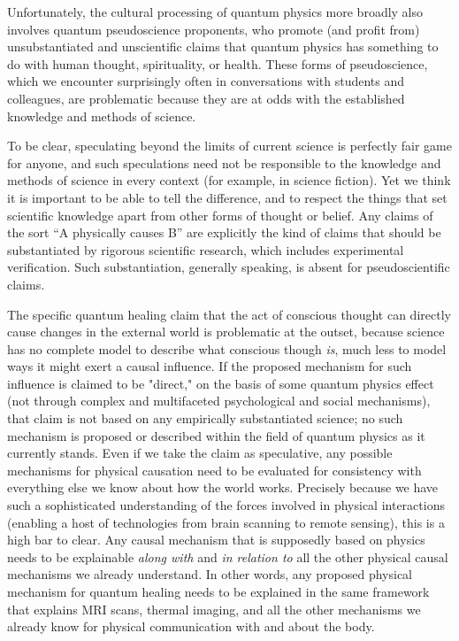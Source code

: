 \documentclass[onecolumn,preprintnumbers,amsmath,amssymbn,reprint,nofootinbib,superscriptaddress]{revtex4}    %
\begin{document}
Unfortunately, the cultural processing of quantum physics more broadly also involves quantum pseudoscience proponents, who promote (and profit from) unsubstantiated and unscientific claims that quantum physics has something to do with human thought, spirituality, or health\cite{Pessoa}.  These forms of pseudoscience, which we encounter surprisingly often in conversations with students and colleagues, are problematic because they are at odds with the established knowledge and methods of science. 

To be clear, speculating beyond the limits of current science is perfectly fair game for anyone, and such speculations need not be responsible to the knowledge and methods of science in every context (for example, in science fiction).  Yet we think it is important to be able to tell the difference, and to respect the things that set scientific knowledge apart from other forms of thought or belief. Any claims of the sort ``A physically causes B'' are explicitly the kind of claims that should be substantiated by rigorous scientific research, which includes experimental verification.  
Such substantiation, generally speaking, is absent for pseudoscientific claims.  

The specific quantum healing claim that the act of conscious thought can directly cause changes in the external world is problematic at the outset, because science has no complete model to describe what conscious though {\em is}, much less to model ways it might exert a causal influence. If the proposed mechanism for such influence is claimed to be "direct," on the basis of some quantum physics effect (not through complex and multifaceted psychological and social mechanisms), that claim is not based on any empirically substantiated science; no such mechanism is proposed or described within the field of quantum physics as it currently stands.  Even if we take the claim as speculative, any possible mechanisms for physical causation need to be evaluated for consistency with everything else we know about how the world works. Precisely because we have such a sophisticated understanding of the forces involved in physical interactions (enabling a host of technologies from brain scanning to remote sensing), this is a high bar to clear. Any causal mechanism that is supposedly based on physics needs to be explainable {\em along with} and {\em in relation to} all the other physical causal mechanisms we already understand.  In other words, any proposed physical mechanism for quantum healing needs to be explained in the same framework that explains MRI scans, thermal imaging, and all the other mechanisms we already know for physical communication with and about the body.   
\end{document}
